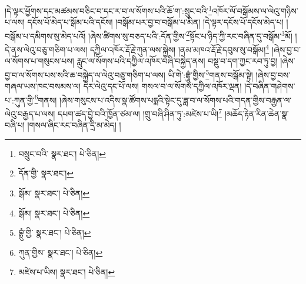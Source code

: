 །དེ་ལྟར་ཕྱོགས་དང་མཚམས་བཅིང་བ་དང་ར་བ་ལ་སོགས་པའི་ཆོ་ག་:སྲུང་བའི་\footnote{བསྲུང་བའི་  སྣར་ཐང་།  པེ་ཅིན། }འཁོར་ལོ་བསྒོམས་ལ་ལེའུ་གཉིས་པ་ལས། དངོས་པོ་མེད་པ་སྒོམ་པའི་དངོས། །བསྒོམ་པར་བྱ་བ་བསྒོམ་པ་མིན། །དེ་ལྟར་དངོས་པོ་དངོས་མེད་པ། །བསྒོམ་པ་དམིགས་སུ་མེད་པའོ། །ཞེས་ཚིགས་སུ་བཅད་པའི་:དོན་གྱིས་\footnote{དོན་གྱི་  སྣར་ཐང་། }སྟོང་པ་ཉིད་ཀྱི་རང་བཞིན་དུ་བསྒོམ་\footnote{སྒོམ་  སྣར་ཐང་།  པེ་ཅིན། }མོ། །དེ་ནས་ལེའུ་བཅུ་གཅིག་པ་ལས། དཀྱིལ་འཁོར་རྡོ་རྗེ་ཀུན་ལས་སྐྱེས། །ནམ་མཁའ་རྡོ་རྗེ་དབུས་སུ་བསྒོམ།\footnote{སྒོམ།  སྣར་ཐང་།  པེ་ཅིན། } །ཞེས་བྱ་བ་ལ་སོགས་པ་གསུངས་པས། རླུང་ལ་སོགས་པའི་དཀྱིལ་འཁོར་བཞི་བསྐྱེད་ནས། བསྡུ་བ་དག་ཀྱང་རབ་ཏུ་བྱ། །ཞེས་བྱ་བ་ལ་སོགས་པས་སའི་ཆ་བསྐྱེད་ལ་ལེའུ་བཅུ་གཅིག་པ་ལས། ཡི་གེ་:བྷྲཱུཾ་གྱིས་\footnote{བྷྲུཾ་གྱི་  སྣར་ཐང་།  པེ་ཅིན། }གནས་བསྒོམ་སྟེ། །ཞེས་བྱ་བས་གཞལ་ཡས་ཁང་བསམས་ལ། དེར་ལེའུ་དང་པོ་ལས། གསལ་བ་ལ་སོགས་དཀྱིལ་འཁོར་ལྡན། །དེ་བཞིན་གཤེགས་པ་:ཀུན་གྱི་\footnote{ཀུན་གྱིས་  སྣར་ཐང་།  པེ་ཅིན། }གནས། །ཞེས་གསུངས་པ་འདིས་སྣ་ཚོགས་པདྨའི་སྟེང་དུ་ཟླ་བ་ལ་སོགས་པའི་གདན་གྱིས་བརྒྱན་ལ་ལེའུ་བརྒྱད་པ་ལས། དཔག་ཚད་བྱེ་བའི་ཁྱོན་ཙམ་ལ། །གྲུ་བཞི་ཤིན་ཏུ་:མཛེས་པ་ཡི།\footnote{མཛེས་པ་ཡིས།  སྣར་ཐང་།  པེ་ཅིན། } །མཆོད་རྟེན་རིན་ཆེན་སྣ་བཞི་པ། །གསལ་ཞིང་རང་བཞིན་དྲི་མ་མེད། །
